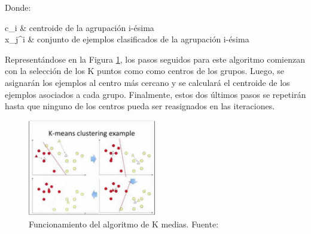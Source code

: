 \begin{itemize}
	Donde:
	\begin{conditions}
		c_i   &  centroide de la agrupación i-ésima \\
		x_j^i   &  conjunto de ejemplos clasificados de la agrupación i-ésima
	\end{conditions}
	
	Representándose en la Figura \ref{2:fig3}, los pasos seguidos para este algoritmo comienzan con la selección de los K puntos como como centros de los grupos. Luego, se asignarán los ejemplos al centro más cercano y se calculará el centroide de los ejemplos asociados a cada grupo. Finalmente, estos dos últimos pasos se repetirán hasta que ninguno de los centros pueda ser reasignados en las iteraciones.
	\begin{figure}[h]
		\begin{center}
			\includegraphics[width=0.50\textwidth]{2/figures/kmeans.jpg}
			\caption{Funcionamiento del algoritmo de K medias. Fuente: \cite{tec_sancho2018supnosup}}
			\label{2:fig3}
		\end{center}
	\end{figure}
		

\end{itemize}
